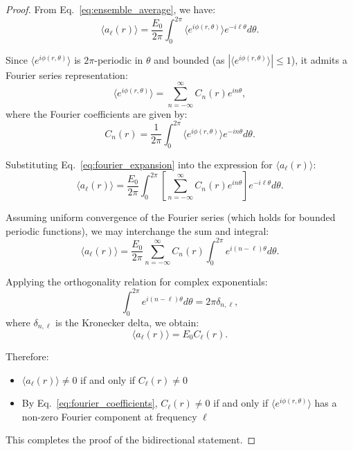 \documentclass[a4paper,12pt]{article}
\newcommand{\ev}[1]{\langle #1 \rangle}
\begin{document}
\begin{proof}
From Eq.~\ref{eq:ensemble_average}, we have:
\begin{equation}
    \ev{a_\ell(r)} = \frac{E_0}{2\pi} \int_0^{2\pi} \ev{e^{i\phi(r,\theta)}} e^{-i\ell\theta} d\theta.
\end{equation}

Since $\ev{e^{i\phi(r,\theta)}}$ is $2\pi$-periodic in $\theta$ and bounded (as $|\ev{e^{i\phi(r,\theta)}}| \leq 1$), it admits a Fourier series representation:
\begin{equation}
    \ev{e^{i\phi(r,\theta)}} = \sum_{n=-\infty}^{\infty} C_n(r) e^{in\theta},
    \label{eq:fourier_expansion}
\end{equation}
where the Fourier coefficients are given by:
\begin{equation}
    C_n(r) = \frac{1}{2\pi} \int_0^{2\pi} \ev{e^{i\phi(r,\theta)}} e^{-in\theta} d\theta.
    \label{eq:fourier_coefficients}
\end{equation}

Substituting Eq.~\ref{eq:fourier_expansion} into the expression for $\ev{a_\ell(r)}$:
\begin{equation}
    \ev{a_\ell(r)} = \frac{E_0}{2\pi} \int_0^{2\pi} \left[\sum_{n=-\infty}^{\infty} C_n(r) e^{in\theta}\right] e^{-i\ell\theta} d\theta.
\end{equation}

Assuming uniform convergence of the Fourier series (which holds for bounded periodic functions), we may interchange the sum and integral:
\begin{equation}
    \ev{a_\ell(r)} = \frac{E_0}{2\pi} \sum_{n=-\infty}^{\infty} C_n(r) \int_0^{2\pi} e^{i(n-\ell)\theta} d\theta.
\end{equation}

Applying the orthogonality relation for complex exponentials:
\begin{equation}
    \int_0^{2\pi} e^{i(n-\ell)\theta} d\theta = 2\pi \delta_{n,\ell},
\end{equation}
where $\delta_{n,\ell}$ is the Kronecker delta, we obtain:
\begin{equation}
    \ev{a_\ell(r)} = E_0 C_\ell(r).
    \label{eq:final_result}
\end{equation}

Therefore:
\begin{itemize}
    \item $\ev{a_\ell(r)} \neq 0$ if and only if $C_\ell(r) \neq 0$
    \item By Eq.~\ref{eq:fourier_coefficients}, $C_\ell(r) \neq 0$ if and only if $\ev{e^{i\phi(r,\theta)}}$ has a non-zero Fourier component at frequency $\ell$
\end{itemize}

This completes the proof of the bidirectional statement.
\end{proof}
\end{document}
